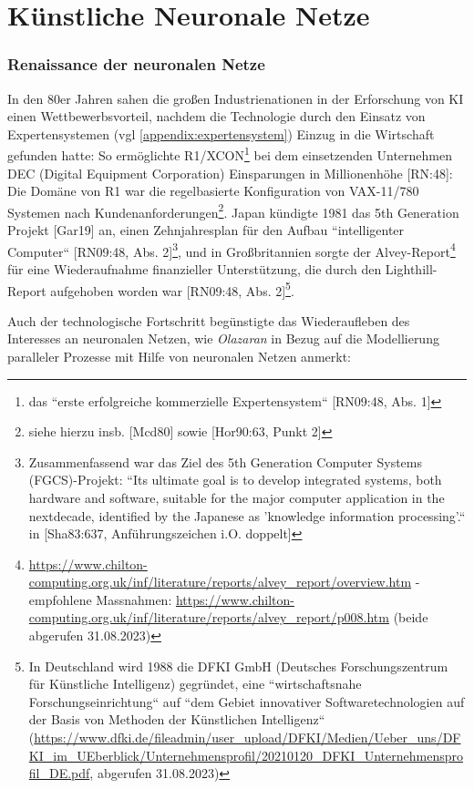 \chapter{Künstliche Neuronale Netze}


\subsection{Renaissance der neuronalen Netze}


In den 80er Jahren sahen die großen Industrienationen in der Erforschung von KI einen Wettbewerbsvorteil, nachdem die Technologie durch den Einsatz von Expertensystemen (vgl \ref{appendix:expertensystem}) Einzug in die Wirtschaft gefunden hatte: So ermöglichte R1/XCON\footnote{
    das ``erste erfolgreiche kommerzielle Expertensystem`` [RN09:48, Abs. 1]
}  bei dem einsetzenden Unternehmen DEC (Digital Equipment Corporation) Einsparungen in Millionenhöhe [RN:48]: Die Domäne von R1 war die regelbasierte Konfiguration von VAX-11/780 Systemen nach Kundenanforderungen\footnote{
    siehe hierzu insb. [Mcd80] sowie [Hor90:63, Punkt 2]
}. Japan kündigte 1981 das 5th Generation Projekt [Gar19] an, einen Zehnjahresplan für den Aufbau ``intelligenter Computer`` [RN09:48, Abs. 2]\footnote{
    Zusammenfassend war das Ziel des 5th Generation Computer Systems (FGCS)-Projekt: ``Its ultimate goal is to develop integrated systems, both hardware and software, suitable for the major computer application in the nextdecade, identified by the Japanese as 'knowledge information processing'.`` in [Sha83:637, Anführungszeichen i.O. doppelt]
}, und in Großbritannien sorgte der Alvey-Report\footnote{
    \url{https://www.chilton-computing.org.uk/inf/literature/reports/alvey\_report/overview.htm} - empfohlene Massnahmen: \url{https://www.chilton-computing.org.uk/inf/literature/reports/alvey\_report/p008.htm} (beide abgerufen 31.08.2023)
} für eine Wiederaufnahme finanzieller Unterstützung, die durch den Lighthill-Report aufgehoben worden war [RN09:48, Abs. 2]\footnote{
    In Deutschland wird 1988 die DFKI GmbH (Deutsches Forschungszentrum für Künstliche Intelligenz) gegründet, eine ``wirtschaftsnahe Forschungseinrichtung`` auf ``dem Gebiet innovativer Softwaretechnologien auf der Basis von Methoden der Künstlichen Intelligenz`` (\url{https://www.dfki.de/fileadmin/user\_upload/DFKI/Medien/Ueber\_uns/DFKI\_im\_UEberblick/Unternehmensprofil/20210120\_DFKI\_Unternehmensprofil\_DE.pdf}, abgerufen 31.08.2023)
}.

Auch der technologische Fortschritt begünstigte das Wiederaufleben des Interesses an neuronalen Netzen, wie \textit{Olazaran} in Bezug auf die Modellierung paralleler Prozesse mit Hilfe von neuronalen Netzen anmerkt:

